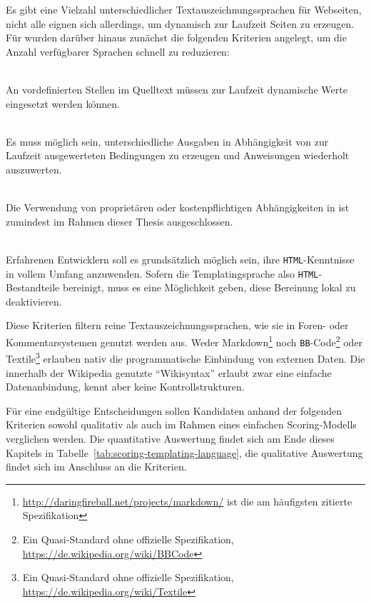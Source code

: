 Es gibt eine Vielzahl unterschiedlicher Textauszeichnungssprachen für Webseiten, nicht alle eignen sich allerdings, um dynamisch zur Laufzeit Seiten zu erzeugen. Für \idename{} wurden darüber hinaus zunächst die folgenden Kriterien angelegt, um die Anzahl verfügbarer Sprachen schnell zu reduzieren:

\begin{description}[noitemsep]
\item[Datenanbindung] \hfill \\
  An vordefinierten Stellen im Quelltext müssen zur Laufzeit dynamische Werte eingesetzt werden können.
\item[Kontrollstrukturen] \hfill \\
  Es muss möglich sein, unterschiedliche Ausgaben in Abhängigkeit von zur Laufzeit ausgewerteten Bedingungen zu erzeugen und Anweisungen wiederholt auszuwerten.
\item[Freie Verfügbarkeit] \hfill \\
  Die Verwendung von proprietären oder kostenpflichtigen Abhängigkeiten in \idename{} ist zumindest im Rahmen dieser Thesis ausgeschlossen.
\item[Einbettung von reinem HTML] \hfill \\
  Erfahrenen Entwicklern soll es grundsätzlich möglich sein, ihre \texttt{HTML}-Kennt\-nisse in vollem Umfang anzuwenden. Sofern die Templatingsprache also \texttt{HTML}-Be\-stand\-teile bereinigt, muss es eine Möglichkeit geben, diese Bereinung lokal zu deaktivieren.
\end{description}

Diese Kriterien filtern reine Textauszeichnungssprachen, wie sie in Foren- oder Kommentarsystemen genutzt werden aus. Weder Markdown\footnote{\url{http://daringfireball.net/projects/markdown/} ist die am häufigsten zitierte Spezifikation} noch \texttt{BB}-Code\footnote{Ein Quasi-Standard ohne offizielle Spezifikation, \url{https://de.wikipedia.org/wiki/BBCode}} oder Textile\footnote{Ein Quasi-Standard ohne offizielle Spezifikation, \url{https://de.wikipedia.org/wiki/Textile}} erlauben nativ die programmatische Einbindung von externen Daten. Die innerhalb der Wikipedia genutzte "`Wikisyntax"' erlaubt zwar eine einfache Datenanbindung, kennt aber keine Kontrollstrukturen.

Für eine endgültige Entscheidungen sollen Kandidaten anhand der folgenden Kriterien sowohl qualitativ als auch im Rahmen eines einfachen Scoring-Modells verglichen werden. Die quantitative Auswertung findet sich am Ende dieses Kapitels in Tabelle~\ref{tab:scoring-templating-language}, die qualitative Auswertung findet sich im Anschluss an die Kriterien.

